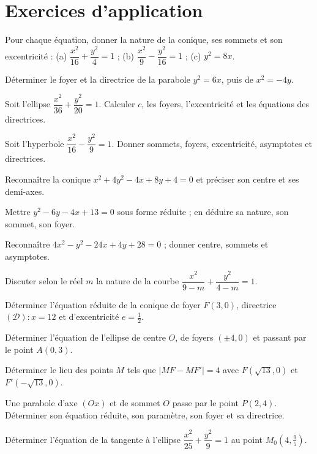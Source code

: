 \section{Exercices d'application}

\exo{} Pour chaque équation, donner la nature de la conique, ses sommets et son
excentricité : (a) $\dfrac{x^{2}}{16}+\dfrac{y^{2}}{4}=1$ ; (b) $\dfrac{x^{2}}{9}-\dfrac{y^{2}}{16}=1$ ;
(c) $y^{2}=8x$.

\exo{} Déterminer le foyer et la directrice de la parabole $y^{2}=6x$, puis de
$x^{2}=-4y$.

\exo{} Soit l'ellipse $\dfrac{x^{2}}{36}+\dfrac{y^{2}}{20}=1$. Calculer $c$, les
foyers, l'excentricité et les équations des directrices.

\exo{} Soit l'hyperbole $\dfrac{x^{2}}{16}-\dfrac{y^{2}}{9}=1$. Donner sommets,
foyers, excentricité, asymptotes et directrices.

\exo{} Reconnaître la conique $x^{2}+4y^{2}-4x+8y+4=0$ et préciser son centre et
ses demi-axes.

\exo{} Mettre $y^{2}-6y-4x+13=0$ sous forme réduite ; en déduire sa nature, son
sommet, son foyer.

\exo{} Reconnaître $4x^{2}-y^{2}-24x+4y+28=0$ ; donner centre, sommets et
asymptotes.

\exo{} Discuter selon le réel $m$ la nature de la courbe
$\dfrac{x^{2}}{9-m}+\dfrac{y^{2}}{4-m}=1$.

\exo{} Déterminer l'équation réduite de la conique de foyer $F(3,0)$, directrice
$(\mathcal D):x=12$ et d'excentricité $e=\tfrac12$.

\exo{} Déterminer l'équation de l'ellipse de centre $O$, de foyers $(\pm4,0)$ et
passant par le point $A(0,3)$.

\exo{} Déterminer le lieu des points $M$ tels que $|MF-MF'|=4$ avec $F(\sqrt{13},0)$
et $F'(-\sqrt{13},0)$.

\exo{} Une parabole d'axe $(Ox)$ et de sommet $O$ passe par le point $P(2,4)$.
Déterminer son équation réduite, son paramètre, son foyer et sa directrice.

\exo{} Déterminer l'équation de la tangente à l'ellipse
$\dfrac{x^{2}}{25}+\dfrac{y^{2}}{9}=1$ au point $M_0(4,\tfrac95)$.

